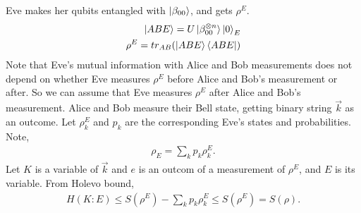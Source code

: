 Eve makes her qubits entangled with $\ket{\beta_{00}}$, and gets $\rho^E$.
\begin{align}
\ket{ABE} = U\ket{\beta_{00}^{\otimes n}}\ket{0}_E\\
\rho^E = tr_{AB} (\ket{ABE} \bra{ABE})
\end{align}
Note that Eve's mutual information with Alice and Bob measurements does not depend on whether Eve measures $\rho^E$ before Alice and Bob's measurement or after.
So we can assume that Eve measures $\rho^E$ after Alice and Bob's measurement.
Alice and Bob measure their Bell state, getting binary string $\vec{k}$ as an outcome.
Let $\rho^E_k$ and $p_k$ are the corresponding Eve's states and probabilities.
Note,
\begin{align}
\rho_E = \sum_k p_k \rho^E_k.
\end{align}
Let $K$ is a variable of $\vec{k}$ and $e$ is an outcom of a measurement of $\rho^E$, and $E$ is its variable.  From Holevo bound, 
\begin{align}
H(K:E) \le S(\rho^E) - \sum_k p_k \rho^E_k \le S(\rho^E) = S(\rho).
\end{align}
